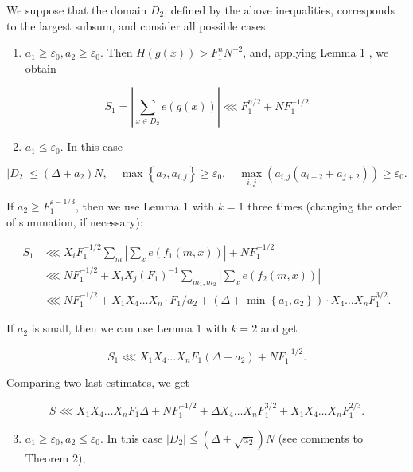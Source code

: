 \documentclass[10pt]{article}
\begin{document}
We suppose that the domain $D_{2}$, defined by the above inequalities, corresponds to the largest subsum, and consider all possible cases.

\begin{enumerate}
  \item $a_{1} \geqslant \varepsilon_{0}, a_{2} \geqslant \varepsilon_{0}$. Then $H(g(x))>F_{1}^{n} N^{-2}$, and, applying Lemma 1 , we obtain
\end{enumerate}

$$
S_{1}=\left|\sum_{x \in D_{2}} e(g(x))\right| \lll F_{1}^{n / 2}+N F_{1}^{-1 / 2}
$$

\begin{enumerate}
  \setcounter{enumi}{1}
  \item $a_{1} \leqslant \varepsilon_{0}$. In this case
\end{enumerate}

$$
\left|D_{2}\right| \leqslant\left(\Delta+a_{2}\right) N, \quad \max \left\{a_{2}, a_{i, j}\right\} \geqslant \varepsilon_{0}, \quad \max _{i, j}\left(a_{i, j}\left(a_{i+2}+a_{j+2}\right)\right) \geqslant \varepsilon_{0} .
$$

If $a_{2} \geqslant F_{1}^{\varepsilon-1 / 3}$, then we use Lemma 1 with $k=1$ three times (changing the order of summation, if necessary):

$$
\begin{aligned}
S_{1} & \lll X_{i} F_{1}^{-1 / 2} \sum_{m}\left|\sum_{x} e\left(f_{1}(m, x)\right)\right|+N F_{1}^{-1 / 2} \\
& \lll N F_{1}^{-1 / 2}+X_{i} X_{j}\left(F_{1}\right)^{-1} \sum_{m_{1}, m_{2}}\left|\sum_{x} e\left(f_{2}(m, x)\right)\right| \\
& \lll N F_{1}^{-1 / 2}+X_{1} X_{4} \ldots X_{n} \cdot F_{1} / a_{2}+\left(\Delta+\min \left\{a_{1}, a_{2}\right\}\right) \cdot X_{4} \ldots X_{n} F_{1}^{3 / 2} .
\end{aligned}
$$

If $a_{2}$ is small, then we can use Lemma 1 with $k=2$ and get

$$
S_{1} \lll X_{1} X_{4} \ldots X_{n} F_{1}\left(\Delta+a_{2}\right)+N F_{1}^{-1 / 2} .
$$

Comparing two last estimates, we get

$$
S \lll X_{1} X_{4} \ldots X_{n} F_{1} \Delta+N F_{1}^{-1 / 2}+\Delta X_{4} \ldots X_{n} F_{1}^{3 / 2}+X_{1} X_{4} \ldots X_{n} F_{1}^{2 / 3} .
$$

\begin{enumerate}
  \setcounter{enumi}{2}
  \item $a_{1} \geqslant \varepsilon_{0}, a_{2} \leqslant \varepsilon_{0}$. In this case $\left|D_{2}\right| \leqslant\left(\Delta+\sqrt{a_{2}}\right) N$ (see comments to Theorem 2),
\end{enumerate}
\end{document}

